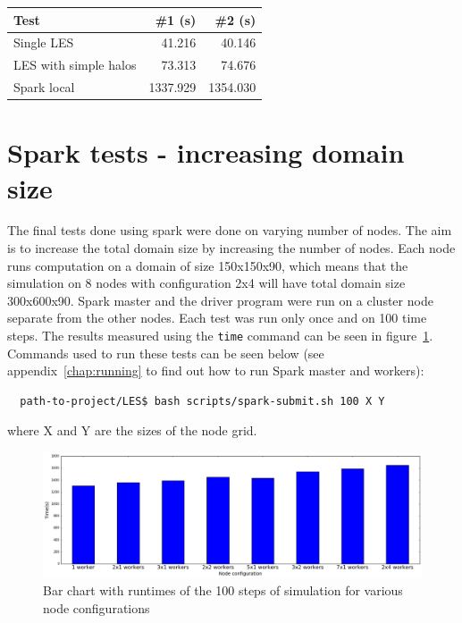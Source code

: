 \documentclass{l4proj}
\begin{document}
\begin{center}
  \begin{tabular}{ | l | r | r | }
      \hline
      Test & \#1 (s) & \#2 (s) \\
      \hline
      Single LES & 41.216 & 40.146 \\
      LES with simple halos & 73.313 & 74.676 \\
      Spark local & 1337.929 & 1354.030 \\
      \hline
  \end{tabular}
  \label{tab:baseline_times}
\end{center}

\section{Spark tests - increasing domain size}

The final tests done using spark were done on varying number of nodes.
The aim is to increase the total domain size by increasing the number of nodes.
Each node runs computation on a domain of size 150x150x90, which means that the simulation
on 8 nodes with configuration 2x4 will have total domain size 300x600x90. Spark master
and the driver program were run on a cluster node separate from the other nodes.
Each test was run only once and on 100 time steps. The results measured using the \texttt{time} command
can be seen in figure~\ref{fig:eval}. Commands used to run these tests can be seen below
(see appendix~\ref{chap:running} to find out how to run Spark master and workers):
\begin{verbatim}
  path-to-project/LES$ bash scripts/spark-submit.sh 100 X Y
\end{verbatim}
where X and Y are the sizes of the node grid.

\begin{figure}
\centering
\includegraphics[width=1\textwidth]{images/evaluation.png}
\caption{Bar chart with runtimes of the 100 steps of simulation for various node configurations}
\label{fig:eval}
\end{figure}
\end{document}
